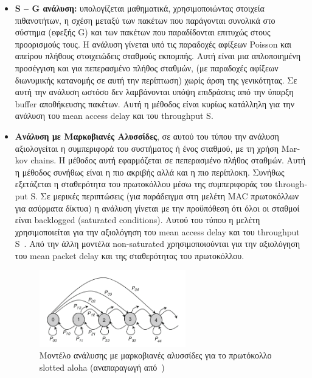 \documentclass[12pt]{report}
\begin{document}
\begin{itemize}
  \item \textbf{\textlatin{S – G} ανάλυση:} υπολογίζεται μαθηματικά, χρησιμοποιώντας στοιχεία πιθανοτήτων, η σχέση μεταξύ των πακέτων που παράγονται συνολικά στο σύστημα (εφεξής \textlatin{G}) και των πακέτων που παραδίδονται επιτυχώς στους προορισμούς τους. Η ανάλυση γίνεται υπό τις παραδοχές αφίξεων \textlatin{Poisson} και απείρου πλήθους στοιχειώδεις σταθμούς εκπομπής. Αυτή είναι μια απλοποιημένη προσέγγιση και για πεπερασμένο πλήθος σταθμών, (με παραδοχές αφίξεων διωνυμικής κατανομής σε αυτή την περίπτωση) χωρίς άρση της γενικότητας. Σε αυτή την ανάλυση ωστόσο δεν λαμβάνονται υπόψη επιδράσεις από την ύπαρξη \textlatin{buffer} αποθήκευσης πακέτων. Αυτή η μέθοδος είναι κυρίως κατάλληλη για την ανάλυση του \textlatin{mean access delay} και του \textlatin{throughput S}.

  \item \textbf{Ανάλυση με Μαρκοβιανές Αλυσσίδες}, σε αυτού του τύπου την ανάλυση αξιολογείται η συμπεριφορά του συστήματος ή ένος σταθμού, με τη χρήση \textlatin{Markov chains}. Η μέθοδος αυτή εφαρμόζεται σε πεπερασμένο πλήθος σταθμών. Αυτή η μέθοδος συνήθως είναι η πιο ακριβής αλλά και η πιο περίπλοκη. Συνήθως εξετάζεται η σταθερότητα του πρωτοκόλλου μέσω της συμπεριφοράς του \textlatin{throughput S}. Σε μερικές περιπτώσεις (για παράδειγμα στη μελέτη \textlatin{MAC} πρωτοκόλλων για ασύρματα δίκτυα) η ανάλυση γίνεται με την προϋπόθεση ότι όλοι οι σταθμοί είναι \textlatin{backlogged (saturated conditions)}. Αυτού του τύπου η μελέτη χρησιμοποιείται για την αξιολόγηση του \textlatin{mean access delay} και του \textlatin{throughput S}~\cite{paper:01}. Από την άλλη μοντέλα \textlatin{non-saturated} χρησιμοποιούνται για την αξιολόγηση του \textlatin{mean packet delay} και της σταθερότητας του πρωτοκόλλου.

  \begin{figure}[ht]
  \centering
  \includegraphics[width=0.6\textwidth]{markov_chain}
  \caption{Μοντέλο ανάλυσης με μαρκοβιανές αλυσσίδες για το πρωτόκολλο \textlatin{slotted aloha} (αναπαραγωγή από~\cite{book:01})}
  \label{fig:markov_chain}
  \end{figure}


\end{itemize}
\end{document}
